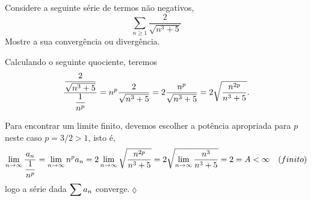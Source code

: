 \begin{exer}
Considere a seguinte s\'{e}rie de termos n\~{a}o negativos,
\begin{equation*}
    \sum_{n\ge 1}\frac{2}{\sqrt{n^3+5}}
\end{equation*}
Mostre a sua converg\^{e}ncia ou diverg\^{e}ncia.
\end{exer}

\solo Calculando o seguinte quociente, teremos
\begin{equation*}
   \frac{\displaystyle{\frac{2}{\sqrt{n^3+5}}}}{\displaystyle{\frac{1}{n^p}}}=n^p\frac{2}{\sqrt{n^3+5}}=2\frac{n^p}{\sqrt{n^3+5}}=
2\sqrt{\frac{n^{2p}}{n^3+5}}.
\end{equation*}

Para encontrar um limite finito, devemos escolher a pot\^{e}ncia
apropriada para $p$ neste caso $p=3/2>1$, isto \'{e},
\begin{equation*}
    \lim_{n\to \infty}\frac{a_n}{\displaystyle{\frac{1}{n^p}}}= \lim_{n\to \infty}n^pa_n=2\lim_{n\to
\infty}\sqrt{\frac{n^{2p}}{n^3+5}}=2\sqrt{\lim_{n\to
\infty}\frac{n^{3}}{n^3+5}}=2=A<\infty\quad (finito)
\end{equation*}
logo a s\'{e}rie dada $\displaystyle{\sum a_n}$ converge.\hfill \(\lozenge\)

